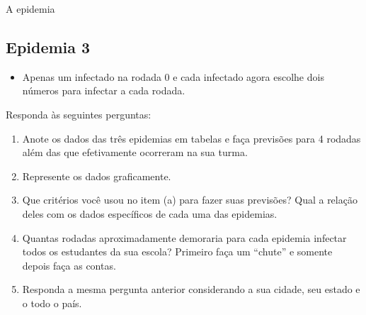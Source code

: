 \begin{task}{A epidemia}
\begin{itemize}
\end{itemize}

\subsection{Epidemia 3}
\begin{itemize}

\item Apenas um infectado na rodada 0 e cada infectado agora escolhe dois números para infectar a cada rodada.

\end{itemize}

Responda às seguintes perguntas:

\begin{enumerate}
\item{} 
Anote os dados das três epidemias em tabelas e faça previsões para 4 rodadas além das que efetivamente ocorreram na sua turma.

\item{} 
Represente os dados graficamente.

\item{} 
Que critérios você usou no item (a) para fazer suas previsões? Qual a relação deles com os dados específicos de cada uma das epidemias.

\item{}
Quantas rodadas aproximadamente demoraria para cada epidemia infectar todos os estudantes da sua escola? Primeiro faça um “chute” e somente depois faça as contas.

\item{}
Responda a mesma pergunta anterior considerando a sua cidade, seu estado e o todo o país.

\end{enumerate}
\end{task}

